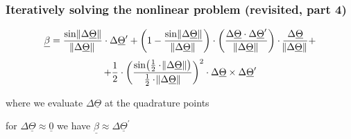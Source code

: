 \begin{frame}
  \frametitle{Iteratively solving the nonlinear problem (revisited, part 4)}
  
  \begin{displaymath}
    \underline{\beta} =
    \frac{\sin \norm{\Delta \underline{\Theta}}}{\norm{\Delta \underline{\Theta}}} \cdot \Delta \underline{\Theta}^{\prime} +
    \biggl( 1 - \frac{\sin \norm{\Delta \underline{\Theta}}}{\norm{\Delta \underline{\Theta}}} \biggr) \cdot \biggl( \frac{\Delta \underline{\Theta} \cdot \Delta \underline{\Theta}^{\prime}}{\norm{\Delta \underline{\Theta}}} \biggr) \cdot \frac{\Delta \underline{\Theta}}{\norm{\Delta \underline{\Theta}}} +
  \end{displaymath}
  \begin{displaymath}
    + \frac{1}{2} \cdot \biggl( \frac{\sin \bigl( \frac{1}{2} \cdot \norm{\Delta \underline{\Theta}} \bigr)}{\frac{1}{2} \cdot \norm{\Delta \underline{\Theta}}} \biggr)^2 \cdot \Delta \underline{\Theta} \times \Delta \underline{\Theta}^{\prime}
  \end{displaymath}
  
  \vspace{0.3em}
  where we evaluate $\Delta \underline{\Theta}$ at the quadrature points
  
  \vspace{0.5em}
  for $\Delta \underline{\Theta} \approx \underline{0}$ we have $\underline{\beta} \approx \Delta \underline{\Theta}^{\prime}$

\end{frame}